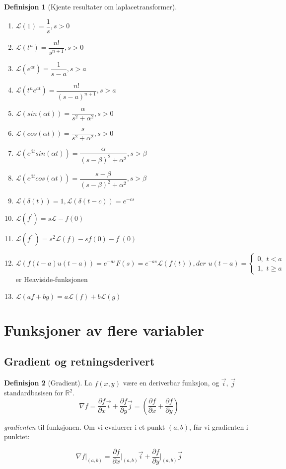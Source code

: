 \documentclass[11pt]{article}
\theoremstyle{definition}
\newtheorem{mindef}{Definisjon}[section]
\newenvironment{fmindef}
{\begin{mdframed}[style=minstil]\begin{mindef}}
		{\end{mindef}\end{mdframed}}
\theoremstyle{definition}
\theoremstyle{definition}
\theoremstyle{definition}
\theoremstyle{definition}
\theoremstyle{definition}
\begin{document}
\begin{mindef}[Kjente resultater om laplacetransformer] \leavevmode
		\begin{enumerate}
		\item \(\mathscr{L}(1)=\dfrac{1}{s},s>0\)
		\item \(\mathscr{L}(t^n)=\dfrac{n!}{s^{n+1}},s>0\)
		\item \(\mathscr{L}(e^{at})=\dfrac{1}{s-a},s>a\)
		\item \(\mathscr{L}(t^ne^{at})=\dfrac{n!}{(s-a)^{n+1}},s>a\)
		\item \(\mathscr{L}(sin(\alpha t))=\dfrac{\alpha}{s^2+\alpha^2},s>0\)
		\item \(\mathscr{L}(cos(\alpha t))=\dfrac{s}{s^2+\alpha^2},s>0\)
		\item \(\mathscr{L}(e^{\beta t} sin(\alpha t))=\dfrac{\alpha}{(s-\beta)^2+\alpha^2},s>\beta\)
		\item \(\mathscr{L}(e^{\beta t }cos(\alpha t))=\dfrac{s-\beta}{(s-\beta)^2+\alpha^2},s>\beta\)
		\item \(\mathscr{L}(\delta (t))=1,\mathscr{L}(\delta (t-c))=e^{-cs}\)
		\item \(\mathscr{L}(f^\prime)=s\mathscr{L}-f(0)\)
		\item \(\mathscr{L}(f^{\prime \prime})=s^2\mathscr{L}(f)-sf(0)-f^\prime (0)\)
		\item \(\mathscr{L}(f(t-a)u(t-a))=e^{-as}F(s)=e^{-as}\mathscr{L}(f(t)), der\,\, u(t-a)= \begin{cases}
		0,\,\, t<a \\
		1,\,\, t\ge a 
		\end{cases}\) er Heaviside-funksjonen
		\item \(\mathscr{L}(af+bg)=a\mathscr{L}(f)+b\mathscr{L}(g)\)
    	\end{enumerate}
\end{mindef}

\newpage

\section{Funksjoner av flere variabler}

\subsection{Gradient og retningsderivert}

\begin{fmindef}[Gradient]
	La \(f(x,y)\) være en deriverbar funksjon, og \(\vec{i} \),  \(\vec{j} \) standardbasisen for \(\mathbb{R}^2 \). 
	\[\nabla f=\frac{\partial f}{\partial x}\vec{i}+\frac{\partial f}{\partial y}\vec{j}=\left(\frac{\partial f}{\partial x}+\frac{\partial f}{\partial y} \right) \]
	
	\textit{gradienten} til funksjonen. Om vi evaluerer i et punkt \((a,b) \), får vi gradienten i punktet:
	
	\[\nabla f\big|_{(a,b)} =\frac{\partial f}{\partial x}\Big|_{(a,b)} \vec{i}+\frac{\partial f}{\partial y}\Big|_{(a,b)} \vec{j} \]
\end{fmindef}
\end{document}
